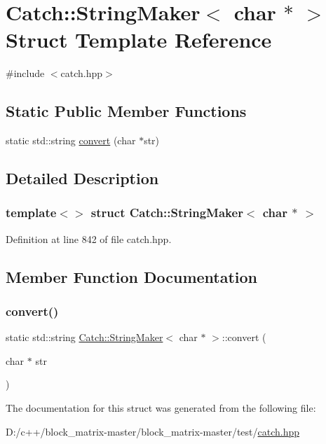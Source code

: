 \hypertarget{struct_catch_1_1_string_maker_3_01char_01_5_01_4}{}\section{Catch\+:\+:String\+Maker$<$ char $\ast$ $>$ Struct Template Reference}
\label{struct_catch_1_1_string_maker_3_01char_01_5_01_4}


{\ttfamily \#include $<$catch.\+hpp$>$}

\subsection*{Static Public Member Functions}
\begin{DoxyCompactItemize}
\item 
static std\+::string \mbox{\hyperlink{struct_catch_1_1_string_maker_3_01char_01_5_01_4_a33049e24281ea6fba48bd8817bdd52bd}{convert}} (char $\ast$str)
\end{DoxyCompactItemize}


\subsection{Detailed Description}
\subsubsection*{template$<$$>$\newline
struct Catch\+::\+String\+Maker$<$ char $\ast$ $>$}



Definition at line 842 of file catch.\+hpp.



\subsection{Member Function Documentation}
\mbox{\label{struct_catch_1_1_string_maker_3_01char_01_5_01_4_a33049e24281ea6fba48bd8817bdd52bd}} 
\subsubsection{\texorpdfstring{convert()}{convert()}}
{\footnotesize\ttfamily static std\+::string \mbox{\hyperlink{struct_catch_1_1_string_maker}{Catch\+::\+String\+Maker}}$<$ char $\ast$ $>$\+::convert (\begin{DoxyParamCaption}\item[{char $\ast$}]{str }\end{DoxyParamCaption})\hspace{0.3cm}{\ttfamily [static]}}



The documentation for this struct was generated from the following file\+:\begin{DoxyCompactItemize}
\item 
D\+:/c++/block\+\_\+matrix-\/master/block\+\_\+matrix-\/master/test/\mbox{\hyperlink{catch_8hpp}{catch.\+hpp}}\end{DoxyCompactItemize}

